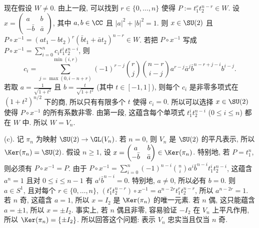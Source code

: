 \begin{solution}
现在假设 $W \neq 0$. 由上一段, 可以找到 $r \in \{0, \ldots, n\}$ 使得 $P := t_1^rt_2^{n-r} \in W$. 设 $x = \begin{pmatrix} a & b \\ -\bar{b} & \bar{a} \end{pmatrix}$, 其中 $a, b \in \CC$ 且 $|a|^2 + |b|^2 = 1$. 则 $x \in \SU(2)$ 且 $P \circ x^{-1} = (at_1 - bt_2)^r(\bar{b}t_1 + \bar{a}t_2)^{n-r} \in W$. 若把 $P \circ x^{-1}$ 写成 $P \circ x^{-1} = \sum_{i=0}^n c_it_1^it_2^{n-i}$, 则
\[
c_i = \sum_{j=\max(0,i-n+r)}^{\min(i,r)}(-1)^{r-j}\binom{r}{j}\binom{n-r}{i-j}a^{r-j}\bar{a}^{j}\bar{b}^{n-r+j-i}b^{i-j}.
\]
若取 $a = \frac{1}{\sqrt{1+t^2}}$ 且 $b = \frac{t}{\sqrt{1+t^2}}$ (其中 $t \in [-1, 1]$), 则每个 $c_i$ 是非零多项式在 $(1+t^2)^{n/2}$ 下的商, 所以只有有限多个 $t$ 使得 $c_i = 0$. 所以可以选择 $x \in \SU(2)$ 使得 $P \circ x^{-1}$ 的所有系数非零. 由第一段, 这蕴含每个单项式 $t_1^it_2^{n-i}$ ($0 \leq i \leq n$) 都在 $W$ 中. 所以 $W = V_n$.

(c). 记 $\pi_n$ 为映射 $\SU(2) \to \GL(V_n)$. 若 $n = 0$, 则 $V_n$ 是 $\SU(2)$ 的平凡表示, 所以 $\Ker(\pi_n) = \SU(2)$. 假设 $n \geq 1$, 设 $x = \begin{pmatrix} a & b \\ -\bar{b} & \bar{a} \end{pmatrix} \in \Ker(\pi_n)$. 特别地, 若 $P = t_1^n$, 则必须有 $P \circ x^{-1} = P$. 由于 $P \circ x^{-1} = \sum_{i=0}^n(-1)^{n-i}\binom{n}{i}a^i\bar{b}^{n-i}t_1^it_2^{n-i}$, 这蕴含 $a^n = 1$ 且对 $0 \leq i \leq n-1$ 有 $a^i\bar{b}^{n-i} = 0$. 特别地, $a \neq 0$, 所以必有 $b = 0$. 则 $a \in S^1$, 且对每个 $r \in \{0, \ldots, n\}$, $(t_1^rt_2^{n-r}) \circ x^{-1} = a^{n-2r}t_1^rt_2^{n-r}$, 所以 $a^{n-2r} = 1$. 若 $n$ 奇, 这蕴含 $a = 1$, 所以 $x = I_2$ 是 $\Ker(\pi_n)$ 的唯一元素. 若 $n$ 偶, 这只能蕴含 $a = \pm 1$, 所以 $x = \pm I_2$. 事实上, 若 $n$ 偶且非零, 容易验证 $-I_2$ 在 $V_n$ 上平凡作用, 所以 $\Ker(\pi_n) = \{\pm I_2\}$.
所以回答这个问题: 表示 $V_n$ 忠实当且仅当 $n$ 奇.
\end{solution}

